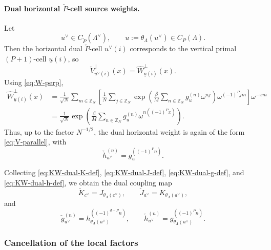 \paragraph{Dual horizontal \(\check P\)-cell source weights.}
Let
\begin{equation}
u^\vee\in C_{\check P}(\Lambda^\vee),
\qquad
u:=\theta_\Lambda(u^\vee)\in C_P(\Lambda).
\end{equation}
Then the horizontal dual \(\check P\)-cell \(u^\vee(i)\) corresponds to the vertical primal
\((P+1)\)-cell \(\underline u(i)\), so
\begin{equation}
	\check V_{u^\vee(i)}^{\parallel}(x)
	=
	\widehat W_{\underline u(i)}^{\perp}(x).
\end{equation}
Using \eqref{eq:W-perp},
\begin{align}
	\widehat W_{\underline u(i)}^{\perp}(x)
	&=
	\frac{1}{\sqrt N}\sum_{m\in \mathbb Z_N}
	\left[
	\frac{1}{N}\sum_{j\in\mathbb Z_N}
	\exp \left(\frac{\beta}{M}\sum_{n\in\mathbb Z_N}g_u^{(n)}\omega^{nj}\right)
	\omega^{(-1)^Pjm}
	\right]\omega^{-xm}
	\nonumber\\
	&=
	\frac{1}{\sqrt N}
	\exp \left(\frac{\beta}{M}\sum_{n\in\mathbb Z_N}g_u^{(n)}\omega^{n((-1)^P x)}\right).
	\label{eq:KW-dual-horizontal-V-explicit}
\end{align}
Thus, up to the factor \(N^{-1/2}\), the dual horizontal weight is again of the form
\eqref{eq:V-parallel}, with
\begin{equation}
	\check h_{u^\vee}^{(n)}
	=
	g_{u}^{((-1)^Pn)}.
	\label{eq:KW-dual-h-def}
\end{equation}

Collecting \eqref{eq:KW-dual-K-def}, \eqref{eq:KW-dual-J-def},
\eqref{eq:KW-dual-g-def}, and \eqref{eq:KW-dual-h-def}, we obtain the dual coupling map
\begin{equation}
	\check K_{c^\vee}=J_{\theta_\Lambda(c^\vee)},
	\qquad
	\check J_{a^\vee}=K_{\theta_\Lambda(a^\vee)},
	\label{eq:KW-dual-JK-map}
\end{equation}
and
\begin{equation}
	\check g_{u^\vee}^{(n)}
	=
	h_{\theta_\Lambda(u^\vee)}^{((-1)^{d-P}n)},
	\qquad
	\check h_{u^\vee}^{(n)}
	=
	g_{\theta_\Lambda(u^\vee)}^{((-1)^P n)}.
	\label{eq:KW-dual-gh-map}
\end{equation}

\subsubsection{Cancellation of the local factors}

